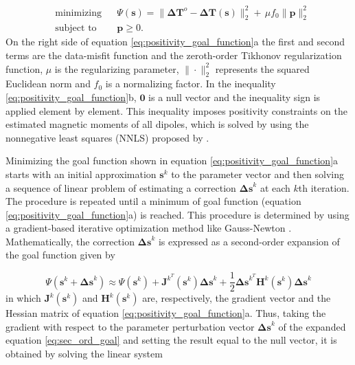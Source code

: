 \begin{subequations}
\begin{align}
& \text{minimizing}
& &\Psi(\mathbf{s}) =\lVert \mathbf{\Delta T}^o - \mathbf{\Delta T} (\mathbf{s}) \rVert_{2}^{2} + \, \mu f_0 \parallel \mathbf{p} \parallel_{2}^{2} \\
& \text{subject to}
& & \mathbf{p} \geqslant 0.
\end{align}
\label{eq:positivity_goal_function}
\end{subequations}
On the right side of equation \ref{eq:positivity_goal_function}a the first and second terms are the data-misfit function and the zeroth-order Tikhonov regularization function, $\mu$ is the regularizing parameter, $\| \cdot \|_{2}^{2}$ represents the squared Euclidean norm and $f_0$ is a normalizing factor. In the inequality \ref{eq:positivity_goal_function}b, $\mathbf{0}$ is a null vector and the inequality sign is applied element by element. This inequality imposes positivity constraints on the estimated magnetic moments of all dipoles, which is solved by using the nonnegative least squares (NNLS) proposed by \cite{lawson_hanson_1974}. 

Minimizing the goal function shown in equation \ref{eq:positivity_goal_function}a starts with an initial approximation $\mathbf{s}^k$ to the parameter vector and then solving a sequence of linear problem of estimating a correction $\mathbf{\Delta s}^k$ at each $k$th iteration. The procedure is repeated until a minimum of goal function (equation \ref{eq:positivity_goal_function}a) is reached. This procedure is determined by using a gradient-based iterative optimization method like Gauss-Newton \citep{aster2005}. Mathematically, the correction $\mathbf{\Delta s}^k$ is expressed as a second-order expansion of the goal function given by     

\begin{equation}
\Psi(\mathbf{s}^k + \mathbf{\Delta s}^k) \approx \Psi(\mathbf{s}^k) + \mathbf{J}^{k^T}(\mathbf{s}^k)  \mathbf{\Delta s}^k + 
\frac{1}{2} \mathbf{\Delta s}^{k^T} \mathbf{H}^k(\mathbf{s}^k) \mathbf{\Delta s}^k
\label{eq:sec_ord_goal}
\end{equation}
in which $\mathbf{J}^{k}(\mathbf{s}^k)$ and $\mathbf{H}^{k}(\mathbf{s}^{k})$ are, respectively, the gradient vector and the Hessian matrix of equation \ref{eq:positivity_goal_function}a. Thus, taking the gradient with respect to the parameter perturbation vector $\mathbf{\Delta s}^k$ of the expanded equation \ref{eq:sec_ord_goal} and setting the result equal to the null vector, it is obtained by solving the linear system

